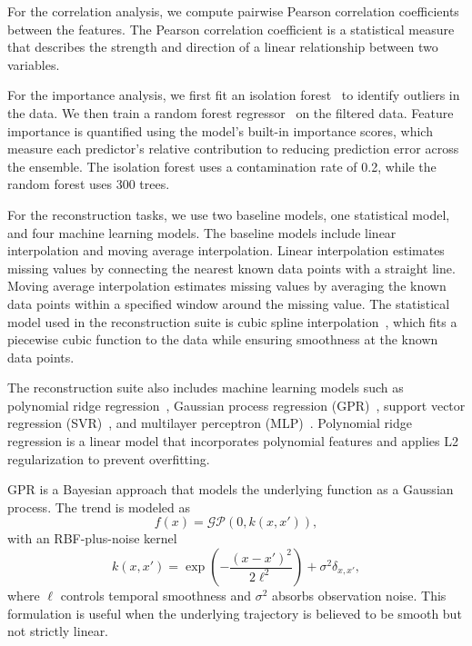 For the correlation analysis, we compute pairwise Pearson correlation coefficients between the features. The Pearson correlation coefficient is a statistical measure that describes the strength and direction of a linear relationship between two variables.

For the importance analysis, we first fit an isolation forest~\cite{tony2008isolation} to identify outliers in the data. We then train a random forest regressor~\cite{breiman2001random} on the filtered data. Feature importance is quantified using the model’s built-in importance scores, which measure each predictor’s relative contribution to reducing prediction error across the ensemble. The isolation forest uses a contamination rate of 0.2, while the random forest uses 300 trees.

For the reconstruction tasks, we use two baseline models, one statistical model, and four machine learning models. The baseline models include linear interpolation and moving average interpolation. Linear interpolation estimates missing values by connecting the nearest known data points with a straight line. Moving average interpolation estimates missing values by averaging the known data points within a specified window around the missing value. The statistical model used in the reconstruction suite is cubic spline interpolation~\cite{de1978practical}, which fits a piecewise cubic function to the data while ensuring smoothness at the known data points.

The reconstruction suite also includes machine learning models such as polynomial ridge regression~\cite{hoerl1970ridge}, Gaussian process regression (GPR)~\cite{seeger2004gaussian}, support vector regression (SVR)~\cite{smola2004tutorial}, and multilayer perceptron (MLP)~\cite{goodfellow2016deep}. Polynomial ridge regression is a linear model that incorporates polynomial features and applies L2 regularization to prevent overfitting.

GPR is a Bayesian approach that models the underlying function as a Gaussian process. The trend is modeled as
\begin{equation}
	f(x) = \mathcal{GP}(0, k(x, x')),
\end{equation}
with an RBF-plus-noise kernel
\begin{equation}
	k(x, x') = \exp \left( -\frac{(x - x')^2}{2 \ell^2} \right) + \sigma^2 \delta_{x, x'},
\end{equation}
where $\ell$ controls temporal smoothness and $\sigma^2$ absorbs observation noise. This formulation is useful when the underlying trajectory is believed to be smooth but not strictly linear.

